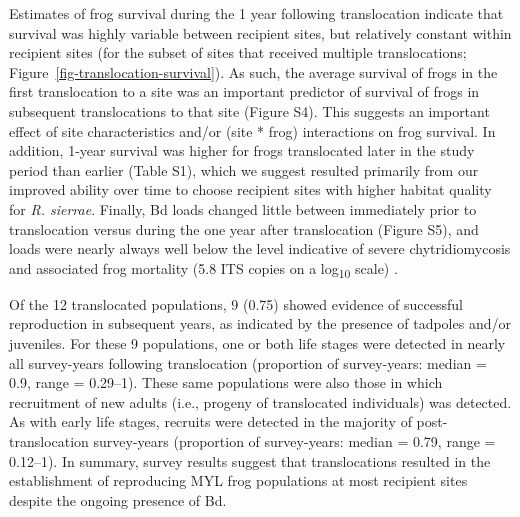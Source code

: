 \documentclass[9pt,twocolumn,twoside,lineno]{pnas-new}
\begin{document}
Estimates of frog survival during the 1 year following translocation
indicate that survival was highly variable between recipient sites, but
relatively constant within recipient sites (for the subset of sites that
received multiple translocations;
Figure~\ref{fig-translocation-survival}). As such, the average survival
of frogs in the first translocation to a site was an important predictor
of survival of frogs in subsequent translocations to that site
(Figure S4). This suggests an important
effect of site characteristics and/or (site * frog) interactions on frog
survival. In addition, 1-year survival was higher for frogs translocated
later in the study period than earlier
(Table S1), which we suggest resulted
primarily from our improved ability over time to choose recipient sites
with higher habitat quality for \emph{R. sierrae}. Finally, Bd loads
changed little between immediately prior to translocation versus during
the one year after translocation (Figure S5), and loads were nearly always well below the level indicative of
severe chytridiomycosis and associated frog mortality (5.8 ITS copies on
a log\textsubscript{10} scale) \citep{vredenburg2010, joseph2018}.

Of the 12 translocated populations, 9 (0.75) showed evidence of
successful reproduction in subsequent years, as indicated by the
presence of tadpoles and/or juveniles. For these 9 populations, one or
both life stages were detected in nearly all survey-years following
translocation (proportion of survey-years: median = 0.9, range =
0.29--1). These same populations were also those in which recruitment of
new adults (i.e., progeny of translocated individuals) was detected. As
with early life stages, recruits were detected in the majority of
post-translocation survey-years (proportion of survey-years: median =
0.79, range = 0.12--1). In summary, survey results suggest that
translocations resulted in the establishment of reproducing MYL frog
populations at most recipient sites despite the ongoing presence of Bd.
\end{document}
